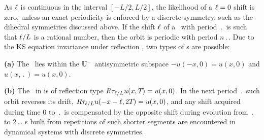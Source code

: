 
As $\ell$ is continuous in the interval $[-L/2, L/2]$,
the likelihood of a $\ell=0$ shift is zero,
unless an exact periodicity is enforced by a discrete symmetry,
such as the dihedral symmetries discussed above.
If the shift $\ell$ of a \rpo\ with period $\period{}$ is such
that $\ell /L$ is a rational number, then the orbit is
periodic with period $n\period{}$.
Due to the KS equation invariance
under reflection ,
two types of \po s are possible:

{\bf (a)} The \po\ lies within the  $\mathbb{U}^-$ antisymmetric subspace
$-u(-x,0) = u(x,0)$ and $u(x,\period{}) = u(x,0)$.

{\bf (b)} The \rpo\ in  is of  reflection type
$R\tau_{\ell/L} u(x,{T_{}}) = u(x,0)$.
In the next period $\period{}$ such orbit
reverses its drift,
$R\tau_{\ell/L} u(-x-\ell,2{T_{}}) = u(x,0)$, and any
shift acquired during time $0$ to
$\period{}$ is compensated by the opposite shift during
evolution from $\period{}$ to $2\period{}$.
\Po s built from repetitions of such shorter segments
are encountered in dynamical systems with discrete
symmetries.
